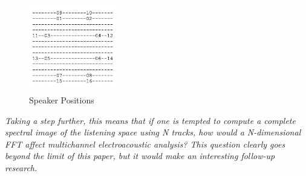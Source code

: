\documentclass{article}
\begin{document}
\begin{figure}
\begin{center}
\includegraphics[width=1.5in]{speaker-positions.jpg}
\end{center}
\caption{Speaker Positions}
\end{figure}




\begin{center}
\textit{Taking a step further, this means that if one is tempted to compute a complete spectral image of the listening space using N tracks, how would a N-dimensional FFT affect multichannel electroacoustic analysis? This question clearly goes beyond the limit of this paper, but it would make an interesting follow-up research.}

\end{center}

\newpage
\end{document}
